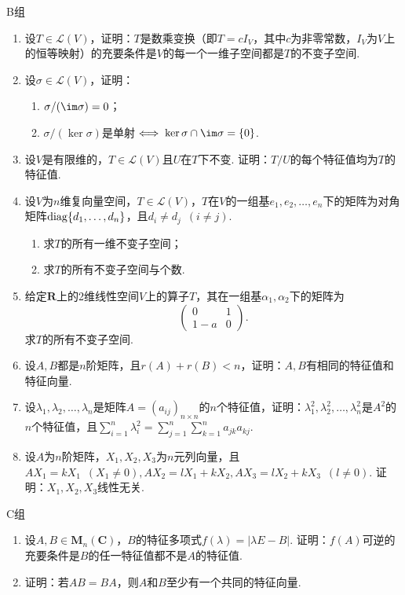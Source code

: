 \centerline{\heiti B组}
\begin{enumerate}
    \item 设$T\in \mathcal{L}(V)$，证明：$T$是数乘变换（即$T=cI_V$，其中$c$为非零常数，$I_V$为$V$上的恒等映射）的充要条件是$V$的每一个一维子空间都是$T$的不变子空间.

    \item 设$\sigma\in \mathcal{L}(V)$，证明：
          \begin{enumerate}
              \item $\sigma/(\im \sigma)=0$；

              \item $\sigma/(\ker \sigma)$是单射$\iff \ker \sigma\cap\im \sigma=\{0\}$.
          \end{enumerate}

    \item 设$V$是有限维的，$T\in \mathcal{L}(V)$且$U$在$T$下不变. 证明：$T/U$的每个特征值均为$T$的特征值.

    \item 设$V$为$n$维复向量空间，$T\in \mathcal{L}(V)$，$T$在$V$的一组基$e_1,e_2,\ldots,e_n$下的矩阵为对角矩阵$\operatorname{diag}\{d_1,\ldots,d_n\}$，且$d_i\neq d_j\enspace(i\neq j)$.
          \begin{enumerate}
              \item 求$T$的所有一维不变子空间；

              \item 求$T$的所有不变子空间与个数.
          \end{enumerate}

    \item 给定$\mathbf{R}$上的2维线性空间$V$上的算子$T$，其在一组基$\alpha_1,\alpha_2$下的矩阵为
          \[\begin{pmatrix}
                  0 & 1 \\ 1-a & 0
              \end{pmatrix}.\]
          求$T$的所有不变子空间.

    \item 设$A,B$都是$n$阶矩阵，且$r(A)+r(B)<n$，证明：$A,B$有相同的特征值和特征向量.

    \item 设$\lambda_1,\lambda_2,\ldots,\lambda_n$是矩阵$A=(a_{ij})_{n\times n}$的$n$个特征值，证明：$\lambda_1^2,\lambda_2^2,\ldots,\lambda_n^2$是$A^2$的$n$个特征值，且$\displaystyle\sum_{i=1}^{n}\lambda_i^2=\displaystyle\sum_{j=1}^{n}\displaystyle\sum_{k=1}^{n}a_{jk}a_{kj}$.

    \item 设$A$为$n$阶矩阵，$X_1,X_2,X_3$为$n$元列向量，且$AX_1=kX_1\enspace(X_1\neq 0),AX_2=lX_1+kX_2,AX_3=lX_2+kX_3\enspace(l\neq 0)$. 证明：$X_1,X_2,X_3$线性无关.
\end{enumerate}

\centerline{\heiti C组}
\begin{enumerate}
    \item 设$A,B\in \mathbf{M}_n(\mathbf{C})$，$B$的特征多项式$f(\lambda)=|\lambda E-B|$. 证明：$f(A)$可逆的充要条件是$B$的任一特征值都不是$A$的特征值.

    \item 证明：若$AB=BA$，则$A$和$B$至少有一个共同的特征向量.
\end{enumerate}
